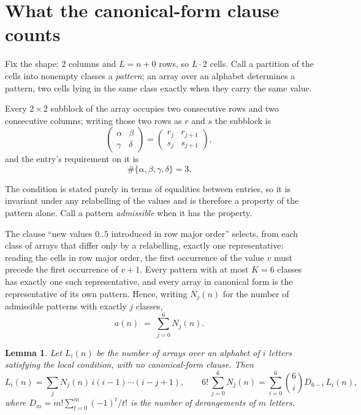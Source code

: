 \documentclass[11pt,a4paper]{article}
\theoremstyle{plain}
\newtheorem{lemma}[theorem]{Lemma}
\theoremstyle{definition}
\begin{document}
\section{What the canonical-form clause counts}

Fix the shape: $2$ columns and $L=n+0$ rows, so $L\cdot2$ cells. Call a
partition of the cells into nonempty classes a \emph{pattern}; an array over an alphabet
determines a pattern, two cells lying in the same class exactly when they carry the same
value.

Every $2\times2$ subblock of the array occupies two consecutive
rows and two consecutive columns; writing those two rows as $r$ and $s$ the
subblock is
\[
\begin{pmatrix}\alpha&\beta\\\gamma&\delta\end{pmatrix}=\begin{pmatrix}r_j&r_{j+1}\\s_j&s_{j+1}\end{pmatrix},
\]
and the entry's requirement on it is
\begin{equation}\label{eq:loc}
\#\{\alpha,\beta,\gamma,\delta\}=3.
\end{equation}

The condition is stated purely in terms of equalities between entries, so it is invariant
under any relabelling of the values and is therefore a property of the pattern alone. Call a
pattern \emph{admissible} when it has the property.

The clause ``new values $0..5$ introduced in row major order'' selects, from each class
of arrays that differ only by a relabelling, exactly one representative: reading the cells in
row major order, the first occurrence of the value $v$ must precede the first occurrence of
$v+1$. Every pattern with at most $K=6$ classes has exactly one such representative, and
every array in canonical form is the representative of its own pattern. Hence, writing
$N_j(n)$ for the number of admissible patterns with exactly $j$ classes,
\begin{equation}\label{eq:apat}
a(n)\;=\;\sum_{j=0}^{6}N_j(n).
\end{equation}

\begin{lemma}\label{lem:inv}
Let $L_i(n)$ be the number of arrays over an alphabet of $i$ letters satisfying the local
condition, with no canonical-form clause. Then
\[
L_i(n)=\sum_j N_j(n)\,i(i-1)\cdots(i-j+1),
\qquad
6!\,\sum_{j=0}^{6}N_j(n)=\sum_{i=0}^{6}\binom{6}{i}D_{6-i}\,L_i(n),
\]
where $D_m=m!\sum_{t=0}^{m}(-1)^t/t!$ is the number of derangements of $m$ letters.
\end{lemma}
\end{document}
